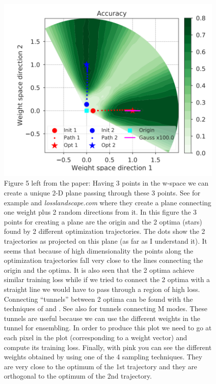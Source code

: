 \begin{figure}
	\centering
	\includegraphics[width=0.7\linewidth]{./Figures/Figure5left.png}
	\caption{Figure 5 left from the paper: 
		Having 3 points in the w-space we can create a unique 2-D plane passing through these 3 points. See for example \textcite{li2018visualizing} and \textit{losslandscape.com} where they create a plane connecting one weight plus 2 random directions from it. In this figure the 3 points for creating a plane are the origin and the 2 optima (stars) found by 2 different optimization trajectories. The dots show the 2 trajectories as projected on this plane (as far as I understand it). It seems that because of high dimensionality the points along the optimization trajectories fall very close to the lines connecting the origin and the optima. It is also seen that the 2 optima achieve similar training loss while if we tried to connect the 2 optima with a straight line we would have to pass through a region of high loss. Connecting ``tunnels'' between 2 optima can be found with the techniques of \textcite{garipov2018loss} and \textcite{draxler2018essentially}. See also \textcite{fort2019large} for tunnels connecting M modes. These tunnels are useful because we can use the different weights in the tunnel for ensembling. In order to produce this plot we need to go at each pixel in the plot (corresponding to a weight vector) and compute its training loss. Finally, with pink you can see the different weights obtained by using one of the 4 sampling techniques. They are very close to the optimum of the 1st trajectory and they are orthogonal to the optimum of the 2nd trajectory.
	}
	\label{}
\end{figure}
